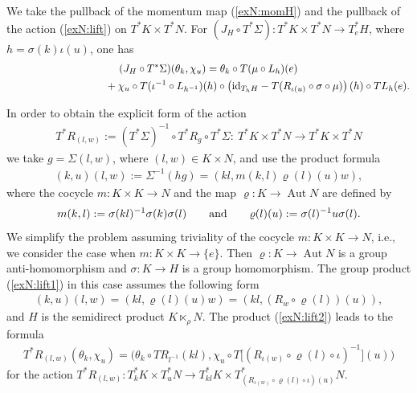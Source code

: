 \documentclass[pdftex]{sigma}
\renewcommand{\to}{\rightarrow}
\newcommand{\id}{\text{\upshape id}}
\newcommand{\Aut}{\operatorname{Aut}}
\numberwithin{equation}{section}
\begin{document}
We take the pullback of the momentum map (\ref{exN:momH}) and the pullback of the action (\ref{exN:lift}) on $T^*K\times T^*N$. For $(J_H\circ T^*\Sigma)\colon T^*K\times T^*N\to T^*_eH$, where $h=\sigma(k)\iota(u)$, one has
\begin{gather*}
(J_H\circ T^*\Sigma)(\theta_k,\chi_u)=\theta_k\circ T(\mu\circ L_h)(e) \\
\hphantom{(J_H\circ T^*\Sigma)(\theta_k,\chi_u)=}{} +\chi_u\circ T(\iota^{-1}\circ L_{h^{-1}})(h)\circ\left(\id_{T_hH}-T(R_{\iota(u)}\circ\sigma\circ \mu)\right)(h)\circ TL_h(e).
\end{gather*}

 In order to obtain the explicit form of the action
\begin{gather*} T^*R_{(l,w)}:=(T^*\Sigma)^{-1}\circ T^*R_g\circ T^*\Sigma\colon \ T^*K\times T^*N\to T^*K\times T^*N\end{gather*}
 we take $g=\Sigma(l,w)$, where $(l,w)\in K\times N$, and use the product formula
\begin{gather} \label{exN:lift1}
 (k,u)(l,w):=\Sigma^{-1}(hg)= (kl,m(k,l)\varrho(l)(u)w ),
\end{gather}
 where the cocycle $m\colon K\times K\to N$ and the map $\varrho\colon K\to \Aut N$ are def\/ined by
 \begin{gather*} m(k,l):=\sigma(kl)^{-1}\sigma(k)\sigma(l)\qquad {\rm and}\qquad \varrho(l)(u):=\sigma(l)^{-1}u\sigma(l).\end{gather*}
 We simplify the problem assuming triviality of the cocycle $m\colon K\times K\to N$, i.e., we consider the case when $m\colon K\times K\to \{e\}$. Then $\varrho\colon K\to \Aut N$ is a group anti-homomorphism and $\sigma\colon K\to H$ is a group homomorphism. The group product (\ref{exN:lift1}) in this case assumes the following form
 \begin{gather}\label{exN:lift2} (k,u)(l,w)= (kl,\varrho(l)(u)w )=(kl,(R_{w}\circ \varrho(l))(u)),\end{gather}
and $H$ is the semidirect product $K\ltimes_\rho N$.
 The product (\ref{exN:lift2}) leads to the formula{\samepage
 \begin{gather}\label{exN:lift3} T^*R_{(l,w)}(\theta_k,\chi_u)=\big(\theta_k\circ TR_{l^{-1}}(kl),\chi_u\circ T\big[(R_{\iota(w)}\circ\varrho(l)\circ\iota)^{-1}\big](u)\big)\end{gather}
 for the action $T^*R_{(l,w)}\colon T_k^*K\times T^*_uN\to T^*_{kl}K\times T^*_{(R_{\iota(w)}\circ\varrho(l)\circ\iota)(u)}N$.}
\end{document}

